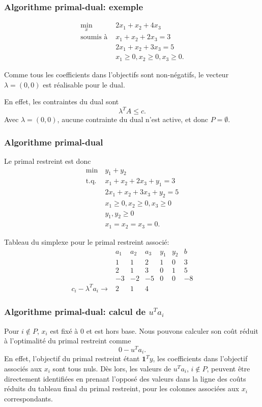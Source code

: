 \documentclass[t,usepdftitle=false]{beamer}
\def\bone{\boldsymbol{1}}
\begin{document}
\begin{frame}
\frametitle{Algorithme primal-dual: exemple}

\begin{align*}
\min_x \ & 2x_1 + x_2 + 4x_3 \\
\mbox{soumis à } & x_1 + x_2 + 2x_3 = 3 \\
& 2x_1 + x_2 + 3x_3 = 5 \\
& x_1 \geq 0, x_2 \geq 0, x_3 \geq 0.
\end{align*}

\mbox{}

Comme tous les coefficients dans l'objectifs sont non-négatifs, le vecteur $\lambda = (0,0)$ est réalisable pour le dual.

\mbox{}

En effet, les contraintes du dual sont
\[
\lambda^T A \leq c.
\]
Avec $\lambda = (0,0)$, aucune contrainte du dual n'est active, et donc $P = \emptyset$.

\end{frame}

\begin{frame}
\frametitle{Algorithme primal-dual}

Le primal restreint est donc
\begin{align*}
\min\ & y_1 + y_2 \\
\mbox{t.q. } & x_1 + x_2 + 2x_3 + y_1 = 3 \\
& 2x_1 + x_2 + 3x_3 + y_2 = 5 \\
& x_1 \geq 0, x_2 \geq 0, x_3 \geq 0 \\
& y_1, y_2 \geq 0 \\
& x_1 = x_2 = x_3 = 0.
\end{align*}

Tableau du simplexe pour le primal restreint associé:
\[
\begin{matrix}
& a_1 & a_2 & a_3 & y_1 & y_2 & b \\
& 1 & 1 & 2 & 1 & 0 & 3 \\
& 2 & 1 & 3 & 0 & 1 & 5 \\
& -3 & -2 & -5 & 0 & 0 & -8 \\
c_i - \lambda^Ta_i \rightarrow & 2 & 1 & 4
\end{matrix}
\]

\end{frame}

\begin{frame}
\frametitle{Algorithme primal-dual: calcul de $u^Ta_i$}

Pour $i \notin P$, $x_i$ est fixé à 0 et est hors base.
Nous pouvons calculer son coût réduit à l'optimalité du primal restreint comme
\[
0 - u^Ta_i.
\]
En effet, l'objectif du primal restreint étant $\bone^Ty$, les coefficients dans l'objectif associés aux $x_i$ sont tous nuls.
Dès lors, les valeurs de $u^Ta_i$, $i \notin P$, peuvent être directement identifiées en prenant l'opposé des valeurs dans la ligne des coûts réduits du tableau final du primal restreint, pour les colonnes associées aux $x_i$ correspondants.

\end{frame}
\end{document}
